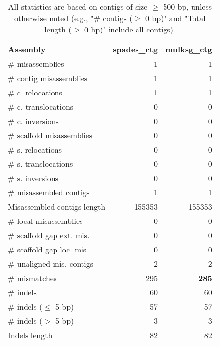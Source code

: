 \documentclass[12pt,a4paper]{article}
\begin{document}
\begin{table}[ht]
\begin{center}
\caption{All statistics are based on contigs of size $\geq$ 500 bp, unless otherwise noted (e.g., "\# contigs ($\geq$ 0 bp)" and "Total length ($\geq$ 0 bp)" include all contigs).}
\begin{tabular}{|l*{2}{|r}|}
\hline
Assembly & spades\_ctg & mulksg\_ctg \\ \hline
\# misassemblies & 1 & 1 \\ \hline
\hspace{2mm}\# contig misassemblies & 1 & 1 \\ \hline
\hspace{5mm}\# c. relocations & 1 & 1 \\ \hline
\hspace{5mm}\# c. translocations & 0 & 0 \\ \hline
\hspace{5mm}\# c. inversions & 0 & 0 \\ \hline
\hspace{2mm}\# scaffold misassemblies & 0 & 0 \\ \hline
\hspace{5mm}\# s. relocations & 0 & 0 \\ \hline
\hspace{5mm}\# s. translocations & 0 & 0 \\ \hline
\hspace{5mm}\# s. inversions & 0 & 0 \\ \hline
\# misassembled contigs & 1 & 1 \\ \hline
Misassembled contigs length & 155353 & 155353 \\ \hline
\# local misassemblies & 0 & 0 \\ \hline
\# scaffold gap ext. mis. & 0 & 0 \\ \hline
\# scaffold gap loc. mis. & 0 & 0 \\ \hline
\# unaligned mis. contigs & 2 & 2 \\ \hline
\# mismatches & 295 & {\bf 285} \\ \hline
\# indels & 60 & 60 \\ \hline
\hspace{5mm}\# indels ($\leq$ 5 bp) & 57 & 57 \\ \hline
\hspace{5mm}\# indels ($>$ 5 bp) & 3 & 3 \\ \hline
Indels length & 82 & 82 \\ \hline
\end{tabular}
\end{center}
\end{table}
\end{document}
